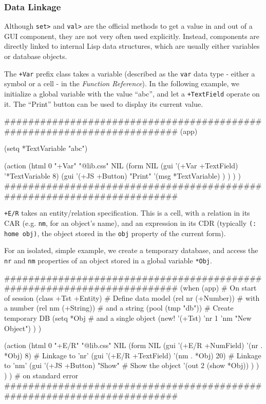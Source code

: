  


\subsubsection{ Data Linkage}
\label{sec:appl-devel-data-linkage}%

Although \texttt{set>} and \texttt{val>} are the official methods to get a value in
and out of a GUI component, they are not very often used explicitly.
Instead, components are directly linked to internal Lisp data
structures, which are usually either variables or database objects.

The \texttt{+Var} prefix class takes a variable (described as the \texttt{var} data
type - either a symbol or a cell - in the \emph{Function Reference}). In the following example, we initialize a global variable
with the value ``abc'', and let a \texttt{+TextField} operate on it. The ``Print''
button can be used to display its current value.


\begin{wideverbatim}
########################################################################
(app)

(setq *TextVariable "abc")

(action
   (html 0 "+Var" "@lib.css" NIL
      (form NIL
         (gui '(+Var +TextField) '*TextVariable 8)
         (gui '(+JS +Button) "Print"
            '(msg *TextVariable) ) ) ) )
########################################################################
\end{wideverbatim}

\texttt{+E/R} takes an entity/relation specification. This is a cell, with a
relation in its CAR (e.g. \texttt{nm}, for an object's name), and an expression
in its CDR (typically \texttt{(: home obj)}, the object stored in the \texttt{obj}
property of the current form).

For an isolated, simple example, we create a temporary database, and
access the \texttt{nr} and \texttt{nm} properties of an object stored in a global
variable \texttt{*Obj}.


\begin{wideverbatim}
########################################################################
(when (app)                # On start of session
   (class +Tst +Entity)    # Define data model
   (rel nr (+Number))      # with a number
   (rel nm (+String))      # and a string
   (pool (tmp "db"))       # Create temporary DB
   (setq *Obj              # and a single object
      (new! '(+Tst) 'nr 1 'nm "New Object") ) )

(action
   (html 0 "+E/R" "@lib.css" NIL
      (form NIL
         (gui '(+E/R +NumField) '(nr . *Obj) 8)    # Linkage to 'nr'
         (gui '(+E/R +TextField) '(nm . *Obj) 20)  # Linkage to 'nm'
         (gui '(+JS +Button) "Show"                # Show the object
            '(out 2 (show *Obj)) ) ) ) )           # on standard error
########################################################################
\end{wideverbatim}


